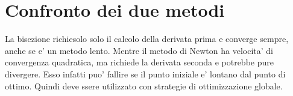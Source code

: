 \section{Confronto dei due metodi}

La bisezione richiesolo solo il calcolo della derivata prima e converge sempre, anche se e' un metodo lento.
Mentre il metodo di Newton ha velocita' di convergenza quadratica, ma richiede la derivata seconda e potrebbe pure divergere.
Esso infatti puo' fallire se il punto iniziale e' lontano dal punto di ottimo. Quindi deve ssere utilizzato con strategie di ottimizzazione globale.
